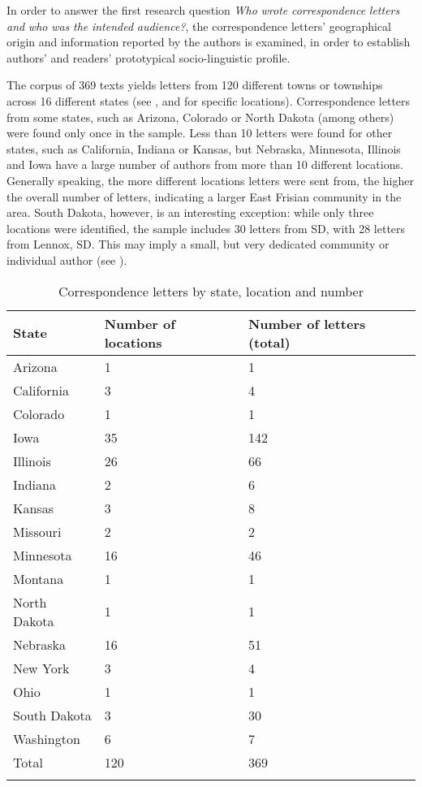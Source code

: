 \documentclass[output=paper]{langsci/langscibook}
\begin{document}
In order to answer the first research question \textit{Who} \textit{wrote} \textit{correspondence} \textit{letters} \textit{and} \textit{who} \textit{was} \textit{the} \textit{intended} \textit{audience?}, the correspondence letters’ geographical origin and information reported by the authors is examined, in order to establish authors’ and readers’ prototypical socio-linguistic profile.

The corpus of 369 texts yields letters from 120 different towns or townships across 16 different states (see , and  for specific locations). Correspondence letters from some states, such as Arizona, Colorado or North Dakota (among others) were found only once in the sample. Less than 10 letters were found for other states, such as California, Indiana or Kansas, but Nebraska, Minnesota, Illinois and Iowa have a large number of authors from more than 10 different locations. Generally speaking, the more different locations letters were sent from, the higher the overall number of letters, indicating a larger East Frisian community in the area. South Dakota, however, is an interesting exception: while only three locations were identified, the sample includes 30 letters from SD, with 28 letters from Lennox, SD. This may imply a small, but very dedicated community or individual author (see ).
 
 
\begin{table}
\begin{tabularx}{0.87\textwidth}{XXX}
\lsptoprule
{State} & Number of locations & Number of letters (total)\\
\hline
Arizona & 1 & 1\\
California & 3 & 4\\
Colorado & 1 & 1\\
Iowa & 35 & 142\\
Illinois & 26 & 66\\
Indiana & 2 & 6\\
Kansas & 3 & 8\\
Missouri & 2 & 2\\
Minnesota & 16 & 46\\
Montana & 1 & 1\\
North Dakota & 1 & 1\\
Nebraska & 16 & 51\\
New York & 3 & 4\\
Ohio & 1 & 1\\
South Dakota & 3 & 30\\
Washington & 6 & 7\\
\hline
Total & 120 & 369\\
\lspbottomrule
\end{tabularx}
\caption{Correspondence letters by state, location and number}
\label{tab:rocker:2}
\end{table}
\end{document}
